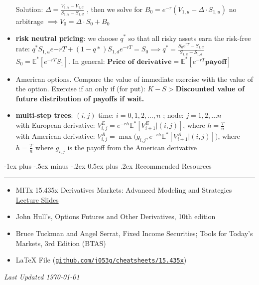 \documentclass[10pt,landscape,a4paper]{article}
\makeatletter
\renewcommand{\section}{\@startsection{section}{1}{0mm}%
                                {-1ex plus -.5ex minus -.2ex}%
                                {0.5ex plus .2ex}%
                                {\normalfont\large\bfseries}}
\makeatother
\begin{document}
\begin{multicols*}{3}
\begin{description}[topsep=0pt]
\begin{itemize}[topsep=0pt]
 		Solution: $\Delta = \frac{ V_{1,u}- V_{1,d}}{S_{1,u}-S_{1,d}}$ , then we solve for $B_0=e^{-r}(V_{1,u}-\Delta \cdot  S_{1,u})$
 		no arbitrage $\implies V_0= \Delta  \cdot S_0 + B_0$
 		\item \textbf{risk neutral pricing}: we choose $q^*$ so that all risky assets earn the risk-free rate:
 		$q^*S_{1,u} e{-rT} + (1-q*)S_{1,d}e^{-rT}=S_0 \implies q^* = \frac{S_0 e^{rT}-S_{1,d}}{S_{1,u}-S_{1,d}}$ \\
 		$S_0 = \mathbb{E}^*[ e^{-rT} S_1]$. In general: $\textbf{Price of derivative} = \mathbb{E}^*[e^{-rT} \textbf{payoff}]$
 		\item American options.  Compare the value of immediate exercise with the value of the option. Exercise if an only if (for put): \textbf{ $K-S>$Discounted value of future distribution of payoffs if wait.}
 		\item \textbf{multi-step trees}:  $(i,j)$ time: $i=0,1,2,\dots, n$ ; node: $j=1,2,...n$ \\
 		with European derivative: $V^E_{i,j} = e^{-rh} \mathbb{E}^*[V^E_{i+1}|(i,j)]$, where $h=\frac{T}{n}$ \\
 		with American derivative: $V^A_{i,j} = \operatorname{max} \Big(g_{i,j}, e^{-rh} \mathbb{E}^*[V^A_{i+1}|(i,j)]\Big)$, where $h=\frac{T}{n}$ where $g_{i,j}$ is the payoff from the American derivative\\
 		
 		
 	\end{itemize}
 \end{description}
 
\newpage

\section{Recommended Resources} \smallskip \hrule height 1pt \smallskip

\bigskip

\begin{itemize}
\item MITx 15.435x 
Derivatives Markets: Advanced Modeling and Strategies \href{https://learning.edx.org/course/course-v1:MITx+15.435x+1T2021/home}{Lecture Slides}

\item John Hull’s, Options Futures and Other Derivatives, 10th edition
\item Bruce Tuckman and Angel Serrat, Fixed Income Securities; Tools for Today’s Markets, 3rd Edition (BTAS) 
\item LaTeX File (\texttt{\href{https://github.com/j053g/cheatsheets/blob/main/15.435x/15.435x_derivatives_markets.tex}{github.com/j053g/cheatsheets/15.435x}})
\end{itemize}





\begin{center}
	\emph{Last Updated \today}
\end{center}

\end{multicols*}
\end{document}

